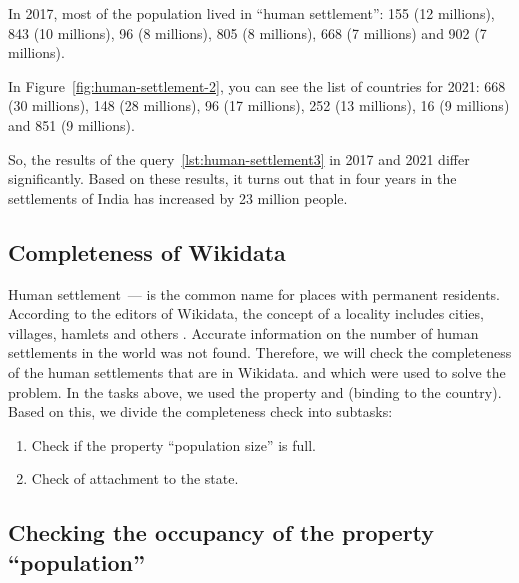 In 2017, most of the population lived in ``human settlement'':
 {155} (\num {12} millions),
 {843} (\num {10} millions),
 {96} (\num {8} millions),
 {805} (\num {8} millions),
 {668} (\num {7} millions) and
 {902} (\num{7} millions).

In Figure~\ref{fig:human-settlement-2}, you can see the list of countries for 2021:
 {668} (\num {30} millions),
 {148} (\num {28} millions),
 {96} (\num {17} millions),
 {252} (\num {13} millions),
 {16} (\num {9} millions) and
 {851} (\num {9} millions).

So, the results of the query~\ref{lst:human-settlement3} in 2017 and 2021 differ significantly.
Based on these results, it turns out that in four years
in the settlements of India has increased by 23 million people.

\subsection{Completeness of Wikidata}

Human settlement~--- is the common name for places with permanent residents.
According to the editors of Wikidata, the concept of a locality includes cities, villages, hamlets
and others .
Accurate information on the number of human settlements in the world was not found.
Therefore, we will check the completeness of the human settlements that are in Wikidata.
and which were used to solve the problem.
In the tasks above, we used the  property and
 (binding to the country).
Based on this, we divide the completeness check into subtasks:
\begin {enumerate}
  \item Check if the property ``population size'' is full.
  \item Check of attachment to the state.
\end {enumerate}

\subsection{Checking the occupancy of the property ``population''}

